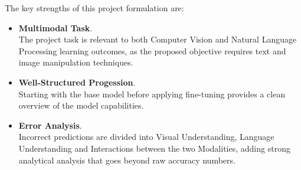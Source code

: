 The key strengths of this project formulation are:
\begin{itemize}
    \renewcommand{\labelitemi}{-}
    \item \textbf{Multimodal Task}. \\ The project task is relevant to both Computer Vision and Natural Language Processing learning outcomes, as the proposed objective requires text and image manipulation techniques.
    \item \textbf{Well-Structured Progession}. \\ Starting with the base model before applying fine-tuning provides a clean overview of the model capabilities.
    \item \textbf{Error Analysis}. \\ Incorrect predictions are divided into Visual Understanding, Language Understanding and Interactions between the two Modalities, adding strong analytical analysis that goes beyond raw accuracy numbers.
\end{itemize}